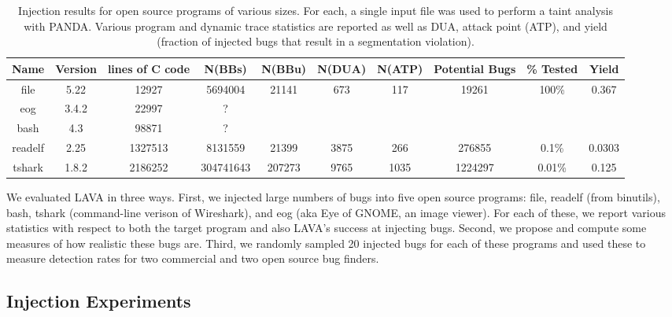 
\label{section:results}

\begin{table}[t!]
\centering
\begin{tabular}{c|c|c|c|c|c|c|c|c|c} 
Name    & Version & lines of C code & N(BBs)     & N(BBu)   &  N(DUA) & N(ATP) & Potential Bugs & \% Tested & Yield \\\hline
file    & 5.22    & 12927           & 5694004    & 21141    & 673     & 117    & 19261          & 100\%     & 0.367  \\
eog     & 3.4.2   & 22997           & ?          &          &         &        &                &           & \\
bash    & 4.3     & 98871           & ?          &          &         &        &                &           & \\
readelf & 2.25    & 1327513         & 8131559    & 21399    & 3875    & 266    & 276855         & 0.1\%     & 0.0303 \\
tshark  & 1.8.2   & 2186252         & 304741643  & 207273   & 9765    & 1035   & 1224297        & 0.01\%    & 0.125 \\
\end{tabular}
\caption{Injection results for open source programs of various sizes.
For each, a single input file was used to perform a taint analysis with PANDA.
Various program and dynamic trace statistics are reported as well as DUA, attack point (ATP), and yield (fraction of injected bugs that result in a segmentation violation).}
\end{table}

We evaluated LAVA in three ways.
First, we injected large numbers of bugs into five open source programs: file, readelf (from binutils), bash, tshark (command-line verison of Wireshark), and eog (aka Eye of GNOME, an image viewer).
For each of these, we report various statistics with respect to both the target program and also LAVA's success at injecting bugs.
Second, we propose and compute some measures of how realistic these bugs are.
Third, we randomly sampled 20 injected bugs for each of these programs and used these to measure detection rates for two commercial and two open source bug finders.

\subsection{Injection Experiments}



